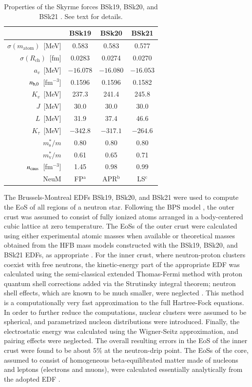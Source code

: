 \documentclass{aa}
\newcommand{\Rc}{R_\mathrm{ch}}
\begin{document}
\begin{table}
\centering
\caption[]{Properties of the Skyrme forces
BSk19, BSk20, and BSk21 \citep{Goriely-ea10}. 
See text for details.}
\label{tab:bskprop}
\begin{tabular}{r|ccc}
\hline\hline\rule[-1.4ex]{0pt}{4.3ex}
  & BSk19 & BSk20 & BSk21  \\
\hline\rule{0pt}{2.7ex}
$\sigma(m_\mathrm{atom})$~[MeV] & 0.583 & 0.583 & 0.577 \\
$\sigma(\Rc)$~[fm] & 0.0283 & 0.0274 & 0.0270 \\
$a_v$~[MeV]  & $-16.078$ & $-16.080$ & $-16.053$ \\
$n_{{\rm b},0}$~[fm$^{-3}$] & 0.1596 & 0.1596 & 0.1582 \\
$K_v$~[MeV] & 237.3 & 241.4 & 245.8 \\
$J$~[MeV] & 30.0 & 30.0 & 30.0 \\
$L$~[MeV] & 31.9 & 37.4 & 46.6 \\
$K_\tau$~[MeV] & $-342.8$ & $-317.1$ & $-264.6$ \\
$m^*_\mathrm{s}/m$ & 0.80 & 0.80 & 0.80 \\
$m^*_\mathrm{v}/m$ & 0.61 & 0.65 & 0.71 \\
$n_{\rm caus}$~[fm$^{-3}$] & 1.45 & 0.98 & 0.99 \\
\hline
NeuM & FP$^\mathrm{a}$ & APR$^\mathrm{b}$ & LS$^\mathrm{c}$ \\
\hline\hline
\end{tabular}
\end{table}

The Brussels-Montreal EDFs BSk19, BSk20, and BSk21 were used to compute the EoS 
of all regions of a neutron star. Following the BPS model \citep{bps1971}, the 
outer crust was assumed to consist of fully ionized atoms arranged in a 
body-centered cubic lattice at zero temperature. The EoSs of the outer crust 
were calculated using either experimental atomic masses when available or 
theoretical masses obtained from the HFB mass models constructed with the 
BSk19, BSk20, and BSk21 EDFs, as appropriate 
\citep[see][for details]{PearsonGC11}. For the inner crust, where 
neutron-proton clusters coexist with free neutrons, the kinetic-energy part of
the appropriate EDF was calculated using the semi-classical extended 
Thomas-Fermi method with 
proton quantum shell corrections added via the Strutinsky integral theorem; 
neutron shell effects, which are known to be much smaller, were neglected 
\citep[see][for details]{Pearson-ea12}. This method is a computationally very 
fast approximation to the full Hartree-Fock equations. In order to further 
reduce the computations, nuclear clusters were assumed to be spherical, and 
parametrized nucleon distributions were introduced. Finally, the electrostatic 
energy was calculated using the Wigner-Seitz approximation, and pairing effects
were neglected. The overall resulting errors in the EoS of the inner crust were
found to be about 5\% at the neutron-drip point. The EoSs of the core, assumed
to consist of homogeneous beta-equilibrated matter made of nucleons and leptons 
(electrons and muons), were calculated essentially analytically from the 
adopted EDF \citep{Goriely-ea10}. 
\end{document}
